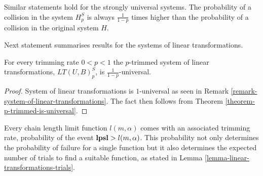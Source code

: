 Similar statements hold for the strongly universal systems. The probability of a collision in the system $H_p^S$ is always $\frac{1}{1 - p}$ times higher than the probability of a collision in the original system $H$.

Next statement summarises results for the systems of linear transformations.

\begin{corollary}
\label{corollary-trimming-linear}
For every trimming rate $0 < p < 1$ the $p$-trimmed system of linear transformations, $LT(U, B)_p^S$, is $\frac{1}{1 - p}$-universal.
\end{corollary}
\begin{proof}
System of linear transformations is $1$-universal as seen in Remark \ref{remark-system-of-linear-transformations}. The fact then follows from  Theorem \ref{theorem-p-trimmed-is-universal}.
\end{proof}

Every chain length limit function $l(m, \alpha)$ comes with an associated trimming rate, probability of the event $\mathbf{lpsl} > l(m, \alpha)$.  This probability not only determines the probability of failure for a single function but it also determines the expected number of trials to find a suitable function, as stated in Lemma \ref{lemma-linear-transformations-trials}. 

